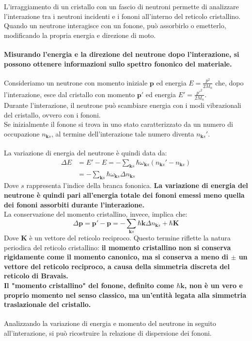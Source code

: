 L'irraggiamento di un cristallo con un fascio di neutroni permette di analizzare l'interazione tra i neutroni incidenti e i fononi all'interno del reticolo cristallino. Quando un neutrone interagisce con un fonone, può assorbirlo o emetterlo, modificando la propria energia e direzione di moto.\\\\
\textbf{Misurando l'energia e la direzione del neutrone dopo l'interazione, si possono ottenere informazioni sullo spettro fononico del materiale.}\\\\
Consideriamo un neutrone con momento iniziale $\mathbf{p}$ ed energia $E = \frac{p^2}{2M_n}$ che, dopo l'interazione, esce dal cristallo con momento $\mathbf{p}'$ ed energia $E' = \frac{p'^2}{2M_n}$.\\
Durante l'interazione, il neutrone può scambiare energia con i modi vibrazionali del cristallo, ovvero con i fononi. \\
Se inizialmente il fonone si trova in uno stato caratterizzato da un numero di occupazione $n_{\mathbf{k}s}$, al termine dell'interazione tale numero diventa $n_{\mathbf{k}s}'$.\\\\
La variazione di energia del neutrone è quindi data da:
\begin{equation}
\begin{split}
\Delta E &= E' - E = - \sum_{\mathbf{k}s} \hbar \omega_{\mathbf{k}s} (n_{\mathbf{k}s}' - n_{\mathbf{k}s}) \\
         &= - \sum_{\mathbf{k}s} \hbar \omega_{\mathbf{k}s} \Delta n_{\mathbf{k}s}
\end{split}
\end{equation}
Dove $s$ rappresenta l'indice della branca fononica. \textbf{La variazione di energia del neutrone è quindi pari all'energia totale dei fononi emessi meno quella dei fononi assorbiti durante l'interazione.}\\
La conservazione del momento cristallino, invece, implica che:
\begin{equation}
\Delta \mathbf{p} = \mathbf{p}' - \mathbf{p} = - \sum_{\mathbf{k}s} \hbar \mathbf{k} \Delta n_{\mathbf{k}s} + \hbar \mathbf{K}
\end{equation}
Dove $\mathbf{K}$ è un vettore del reticolo reciproco. Questo termine riflette la natura periodica del reticolo cristallino: \textbf{il momento cristallino non si conserva rigidamente come il momento canonico, ma si conserva a meno di $\pm$ un vettore del reticolo reciproco, a causa della simmetria discreta del reticolo di Bravais.\\
Il "momento cristallino" del fonone, definito come $\hbar \mathbf{k}$, non è un vero e proprio momento nel senso classico, ma un'entità legata alla simmetria traslazionale del cristallo.}\\\\
Analizzando la variazione di energia e momento del neutrone in seguito all'interazione, si può ricostruire la relazione di dispersione dei fononi.\\\\

